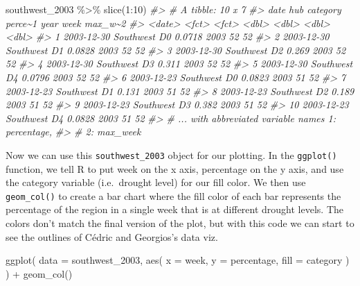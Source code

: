\documentclass[
]{book}
\newenvironment{Shaded}{\begin{snugshade}}{\end{snugshade}}
\newcommand{\AttributeTok}[1]{\textcolor[rgb]{0.77,0.63,0.00}{#1}}
\newcommand{\CommentTok}[1]{\textcolor[rgb]{0.56,0.35,0.01}{\textit{#1}}}
\newcommand{\DecValTok}[1]{\textcolor[rgb]{0.00,0.00,0.81}{#1}}
\newcommand{\FunctionTok}[1]{\textcolor[rgb]{0.00,0.00,0.00}{#1}}
\newcommand{\NormalTok}[1]{#1}
\newcommand{\SpecialCharTok}[1]{\textcolor[rgb]{0.00,0.00,0.00}{#1}}
\begin{document}
\begin{Shaded}
\begin{Highlighting}[]
\NormalTok{southwest\_2003 }\SpecialCharTok{\%\textgreater{}\%}
  \FunctionTok{slice}\NormalTok{(}\DecValTok{1}\SpecialCharTok{:}\DecValTok{10}\NormalTok{)}
\CommentTok{\#\textgreater{} \# A tibble: 10 x 7}
\CommentTok{\#\textgreater{}    date       hub       category perce\textasciitilde{}1  year  week max\_w\textasciitilde{}2}
\CommentTok{\#\textgreater{}    \textless{}date\textgreater{}     \textless{}fct\textgreater{}     \textless{}fct\textgreater{}      \textless{}dbl\textgreater{} \textless{}dbl\textgreater{} \textless{}dbl\textgreater{}   \textless{}dbl\textgreater{}}
\CommentTok{\#\textgreater{}  1 2003{-}12{-}30 Southwest D0        0.0718  2003    52      52}
\CommentTok{\#\textgreater{}  2 2003{-}12{-}30 Southwest D1        0.0828  2003    52      52}
\CommentTok{\#\textgreater{}  3 2003{-}12{-}30 Southwest D2        0.269   2003    52      52}
\CommentTok{\#\textgreater{}  4 2003{-}12{-}30 Southwest D3        0.311   2003    52      52}
\CommentTok{\#\textgreater{}  5 2003{-}12{-}30 Southwest D4        0.0796  2003    52      52}
\CommentTok{\#\textgreater{}  6 2003{-}12{-}23 Southwest D0        0.0823  2003    51      52}
\CommentTok{\#\textgreater{}  7 2003{-}12{-}23 Southwest D1        0.131   2003    51      52}
\CommentTok{\#\textgreater{}  8 2003{-}12{-}23 Southwest D2        0.189   2003    51      52}
\CommentTok{\#\textgreater{}  9 2003{-}12{-}23 Southwest D3        0.382   2003    51      52}
\CommentTok{\#\textgreater{} 10 2003{-}12{-}23 Southwest D4        0.0828  2003    51      52}
\CommentTok{\#\textgreater{} \# ... with abbreviated variable names 1: percentage,}
\CommentTok{\#\textgreater{} \#   2: max\_week}
\end{Highlighting}
\end{Shaded}

Now we can use this \texttt{southwest\_2003} object for our plotting. In the \texttt{ggplot()} function, we tell R to put week on the x axis, percentage on the y axis, and use the category variable (i.e.~drought level) for our fill color. We then use \texttt{geom\_col()} to create a bar chart where the fill color of each bar represents the percentage of the region in a single week that is at different drought levels. The colors don't match the final version of the plot, but with this code we can start to see the outlines of Cédric and Georgios's data viz.~

\begin{Shaded}
\begin{Highlighting}[]
\FunctionTok{ggplot}\NormalTok{(}
  \AttributeTok{data =}\NormalTok{ southwest\_2003,}
  \FunctionTok{aes}\NormalTok{(}
    \AttributeTok{x =}\NormalTok{ week,}
    \AttributeTok{y =}\NormalTok{ percentage,}
    \AttributeTok{fill =}\NormalTok{ category}
\NormalTok{  )}
\NormalTok{) }\SpecialCharTok{+}
  \FunctionTok{geom\_col}\NormalTok{()}
\end{Highlighting}
\end{Shaded}
\end{document}
